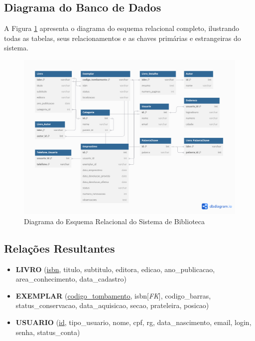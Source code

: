 \documentclass[12pt,a4paper]{article}
\begin{document}
\subsection{Diagrama do Banco de Dados}
A Figura \ref{fig:modelo-relacional} apresenta o diagrama do esquema relacional completo, ilustrando todas as tabelas, seus relacionamentos e as chaves primárias e estrangeiras do sistema.

\begin{figure}[H]
    \centering
    \includegraphics[width=\textwidth]{ModeloRelacional.png}
    \caption{Diagrama do Esquema Relacional do Sistema de Biblioteca}
    \label{fig:modelo-relacional}
\end{figure}

\subsection{Relações Resultantes}

\begin{tcolorbox}[title=Entidades Principais]
\begin{itemize}
    \item \textbf{LIVRO} (\underline{isbn}, titulo, subtitulo, editora, edicao, ano\_publicacao, area\_conhecimento, data\_cadastro)

    \item \textbf{EXEMPLAR} (\underline{codigo\_tombamento}, isbn[\textit{FK}], codigo\_barras, status\_conservacao, data\_aquisicao, secao, prateleira, posicao)

    \item \textbf{USUARIO} (\underline{id}, tipo\_usuario, nome, cpf, rg, data\_nascimento, email, login, senha, status\_conta)
\end{itemize}
\end{tcolorbox}
\end{document}
